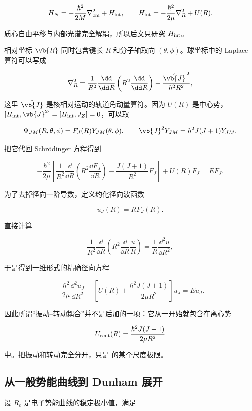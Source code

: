 \begin{equation}
H_N
=-\frac{\hbar^2}{2M}\nabla_{\rm cm}^2
+H_{\rm int},
\qquad
H_{\rm int}
=-\frac{\hbar^2}{2\mu}\nabla_R^2+U(R).
\label{eq:diatomic-internal-hamiltonian}
\end{equation}

质心自由平移与内部光谱完全解耦，所以后文只研究 \(H_{\rm int}\)。

相对坐标 \(\vb{R}\) 同时包含键长 \(R\) 和分子轴取向 \((\theta,\phi)\)。球坐标中的 Laplace 算符可以写成

\begin{equation}
\nabla_R^2
=\frac1{R^2}\frac{\dd}{\dd R}
\left(R^2\frac{\dd}{\dd R}\right)
-\frac{\hat{\vb{J}}^{\,2}}{\hbar^2R^2},
\label{eq:radial-laplacian-angular}
\end{equation}

这里 \(\hat{\vb{J}}\) 是核相对运动的轨道角动量算符。因为 \(U(R)\) 是中心势，\([H_{\rm int},\vb{J}^2]=[H_{\rm int},J_Z]=0\)，可以取

\[
\Psi_{JM}(R,\theta,\phi)
=F_J(R)Y_{JM}(\theta,\phi),
\qquad
\vb{J}^2Y_{JM}=\hbar^2J(J+1)Y_{JM}.
\]

把它代回 Schr\"odinger 方程得到

\[
-\frac{\hbar^2}{2\mu}
\left[
\frac1{R^2}\frac{\dd}{\dd R}
\left(R^2\frac{\dd F_J}{\dd R}\right)
-\frac{J(J+1)}{R^2}F_J
\right]
+U(R)F_J
=EF_J.
\]

为了去掉径向一阶导数，定义约化径向波函数

\[
u_J(R)=R F_J(R).
\]

直接计算

\[
\frac1{R^2}\frac{\dd}{\dd R}
\left(R^2\frac{\dd}{\dd R}\frac{u}{R}\right)
=\frac1R\frac{\dd^2u}{\dd R^2},
\]

于是得到一维形式的精确径向方程

\begin{equation}
-\frac{\hbar^2}{2\mu}\frac{\dd^2u_J}{\dd R^2}
+
\left[
U(R)+\frac{\hbar^2J(J+1)}{2\mu R^2}
\right]u_J
=E u_J.
\label{eq:diatomic-radial-equation}
\end{equation}

因此所谓“振动--转动耦合”并不是后加的一项：它从一开始就包含在离心势

\[
U_{\rm cent}(R)=\frac{\hbar^2J(J+1)}{2\mu R^2}
\]

中。把振动和转动完全分开，只是  的某个尺度极限。

\subsection{从一般势能曲线到 Dunham 展开}
设 \(R_e\) 是电子势能曲线的稳定极小值，满足

